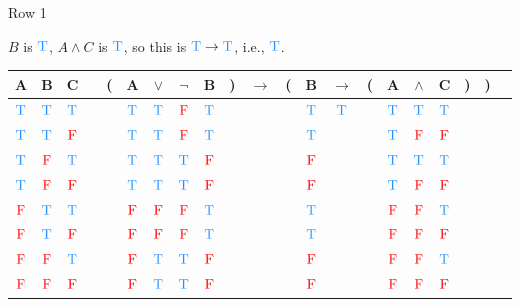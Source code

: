 \documentclass[
  ignorenonframetext,
]{beamer}
\renewcommand{\,}{\text{, }}
\def\True{\textcolor{dodgerblue}{\text{T}}}
\def\False{\textcolor{red}{\text{F}}}
\begin{document}
\begin{frame}{Row 1}
\protect\hypertarget{row-1}{}

\(B\) is \(\True\), \(A \wedge C\) is \(\True\), so this is
\(\True \rightarrow \True\), i.e., \(\True\).

\begin{center}
\bigskip
\begin{tabular}{@{ }c@{ }@{ }c@{ }@{ }c | c@{ }@{}c@{}@{ }c@{ }@{ }c@{ }@{ }c@{ }@{ }c@{ }@{}c@{}@{ }c@{ }@{}c@{}@{ }c@{ }@{ }c@{ }@{}c@{}@{ }c@{ }@{ }c@{ }@{ }c@{ }@{}c@{}@{}c@{}@{ }c}
A & B & C &  & ( & A & $\vee$ & $\neg$ & B & ) & $\rightarrow$ & ( & B & $\rightarrow$ & ( & A & $\wedge$ & C & ) & ) & \\
\hline 
 $\True$ & $\True$ & $\True$ &  &  & $\True$ & $\True$ & $\False$ & $\True$ &  &&  & $\True$ & $\True$ &  & $\True$ & $\True$ & $\True$ &  &  & \\
 $\True$ & $\True$ & $\False$ &  &  & $\True$ & $\True$ & $\False$ & $\True$ &  &&  & $\True$ &&  & $\True$ & $\False$ & $\False$ &  &  & \\
 $\True$ & $\False$ & $\True$ &  &  & $\True$ & $\True$ & $\True$ & $\False$ &  &&  & $\False$ &&  & $\True$ & $\True$ & $\True$ &  &  & \\
 $\True$ & $\False$ & $\False$ &  &  & $\True$ & $\True$ & $\True$ & $\False$ &  &&  & $\False$ &&  & $\True$ & $\False$ & $\False$ &  &  & \\
 $\False$ & $\True$ & $\True$ &  &  & $\False$ & $\False$ & $\False$ & $\True$ &  &&  & $\True$ &&  & $\False$ & $\False$ & $\True$ &  &  & \\
 $\False$ & $\True$ & $\False$ &  &  & $\False$ & $\False$ & $\False$ & $\True$ &  &&  & $\True$ &&  & $\False$ & $\False$ & $\False$ &  &  & \\
 $\False$ & $\False$ & $\True$ &  &  & $\False$ & $\True$ & $\True$ & $\False$ &  &&  & $\False$ &&  & $\False$ & $\False$ & $\True$ &  &  & \\
 $\False$ & $\False$ & $\False$ &  &  & $\False$ & $\True$ & $\True$ & $\False$ &  &&  & $\False$ &&  & $\False$ & $\False$ & $\False$ &  &  & \\
\end{tabular}
\bigskip
\end{center}

\end{frame}
\end{document}

